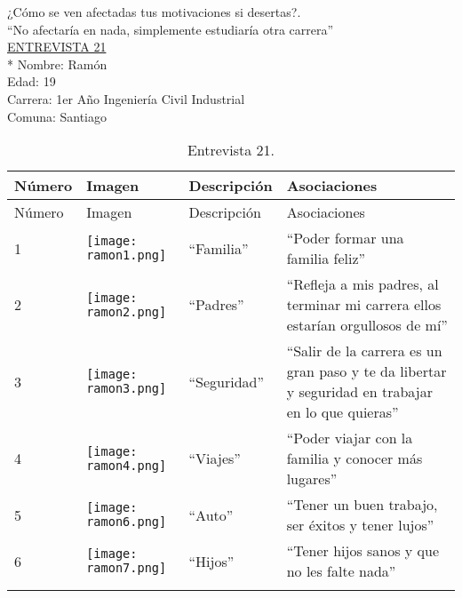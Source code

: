 ¿Cómo se ven afectadas tus motivaciones si desertas?.\\

``No afectaría en nada, simplemente estudiaría otra carrera''\\



\underline {ENTREVISTA 21}\\*
Nombre: Ramón\\
Edad: 19 \\
Carrera: 1er Año Ingeniería Civil Industrial\\
Comuna: Santiago\\

\begin{longtable}{>{\centering\arraybackslash}m{1cm} >{\centering\arraybackslash}m{2cm} >{\arraybackslash}m{5cm}>{\arraybackslash}m{5cm}}
	
	\hline
	Número & Imagen & Descripción & Asociaciones \\
	\hline \hline
	\endfirsthead
	
	\hline
	Número & Imagen & Descripción & Asociaciones \\
	\hline \hline
	\endhead
		
		1 & \texttt{[image: ramon1.png]} & ``Familia'' & ``Poder formar una familia feliz'' \\
		\hline
		
		2 & \texttt{[image: ramon2.png]} & ``Padres'' & ``Refleja a mis padres, al terminar mi carrera ellos estarían orgullosos de mí'' \\
		\hline
		
		3 & \texttt{[image: ramon3.png]} & ``Seguridad'' & ``Salir de la carrera es un gran paso y te da libertar y seguridad en trabajar en lo que quieras'' \\
		\hline
		
		4 & \texttt{[image: ramon4.png]} & ``Viajes'' & ``Poder viajar con la familia y conocer más lugares'' \\
		\hline
		
		
		5 & \texttt{[image: ramon6.png]} & ``Auto'' & ``Tener un buen trabajo, ser éxitos y tener lujos'' \\
		\hline
		
		6 & \texttt{[image: ramon7.png]} & ``Hijos'' & ``Tener hijos sanos y que no les falte nada'' \\
		\hline

	\caption{Entrevista 21.}
	\label{tabla:ramon}
\end{longtable}

